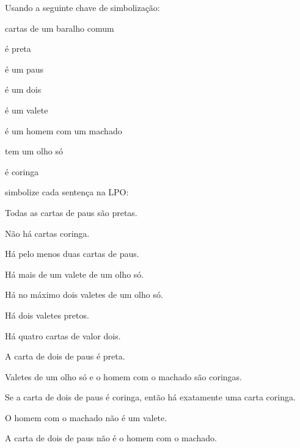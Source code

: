 \solutions
\problempart
\label{pr.FOLcards}
Usando a seguinte chave de simbolização:
\begin{ekey}
\item[\text{domínio}] cartas de um baralho comum
\item[\atom{B}{x}]  é preta
\item[\atom{C}{x}]  é um paus
\item[\atom{D}{x}]  é um dois
\item[\atom{J}{x}]  é um valete
\item[\atom{M}{x}]  é um homem com um machado
\item[\atom{O}{x}]  tem um olho só
\item[\atom{W}{x}]  é coringa
\end{ekey}
simbolize cada sentença na LPO:
\begin{compactlist}
\item Todas as cartas de paus são pretas.
\item Não há cartas coringa.
\item Há pelo menos duas cartas de paus.
\item Há mais de um valete de um olho só.
\item Há no máximo dois valetes de um olho só.
\item Há dois valetes pretos.
\item Há quatro cartas de valor dois.
\item A carta de dois de paus é preta.
\item Valetes de um olho só e o homem com o machado são coringas.
\item Se a carta de dois de paus é coringa, então há exatamente uma carta coringa.
\item O homem com o machado não é um valete.
\item A carta de dois de paus não é o homem com o machado.
\end{compactlist}

\

